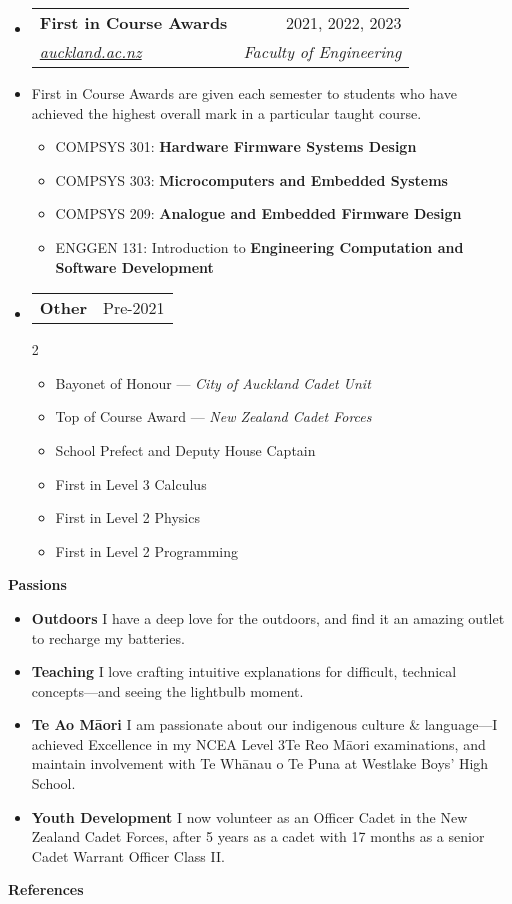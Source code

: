 \documentclass[11pt,a4paper]{article}[leftmargin=*]
\makeatletter
\def \entryspacing {-0pt}
\def \bulletstylei {\faAngleRight\hspace{-4.5pt}}
\renewcommand{\section}[2]{\vspace{5pt}
  \colorbox{secondary}{\color{white}\raggedbottom\normalsize\textbf{{#1}{\hspace{2pt}#2\hspace{4pt}}}}
}
\newcommand{\resumeEntryStart}{\begin{itemize}[leftmargin=2.5mm]}
\newcommand{\resumeEntryEnd}{\end{itemize}\vspace{\entryspacing}}
\newcommand{\resumeItemListStart}{\begin{itemize}[leftmargin=4.5mm]}
\newcommand{\resumeItemListEnd}{\end{itemize}}
\newcommand{\resumeItemListStartColumns}[2][-0.5]{\vspace*{#1\multicolsep}
\begin{multicols}{#2}\begin{itemize}[leftmargin=4.5mm]}
\newcommand{\resumeItemListEndColumns}[1][-1]{\end{itemize}\end{multicols}\vspace*{#1\multicolsep}}
\newcommand{\resumeItem}[2][\bulletstylei]{
  \item[\small#1]\small{
    {#2 \vspace{-2pt}}
  }
}
\newcommand{\resumeEntryTSDL}[4]{
  \vspace{-1pt}\item[]
    \begin{tabularx}{0.97\textwidth}{X@{\hspace{60pt}}r}
      \textbf{\color{primary}#1} & {\firabook\color{accent}\small#2} \\
      \textit{\color{accent}\small#3} & \textit{\color{accent}\small#4} \\
    \end{tabularx}\vspace{-6pt}
}
\newcommand{\resumeEntryTD}[2]{
  \vspace{-1pt}\item[]
    \begin{tabularx}{0.97\textwidth}{X@{\hspace{60pt}}r}
      \textbf{\color{primary}#1} & {\firabook\color{accent}\small#2} \\
    \end{tabularx}\vspace{-6pt}
}
\newcommand{\resumeEntryS}[2]{
  \item[]\small{
    \textbf{\color{primary}#1 }{ #2 \vspace{-4pt}}
  }
}
\newcommand{\resumeEntryP}[1]{
  \item[]\small{
    #1 \vspace{-4pt}
  }\\
}
\newcommand{\resumeIt}[1]{\textit{\color{accent}#1}}
\newcommand{\resumeBf}[1]{\small\textbf{\color{halfbold}#1}}
\makeatother
\begin{document}
\resumeEntryStart
\resumeEntryTSDL
{First in Course Awards}{2021, 2022, 2023}
{\href{https://www.auckland.ac.nz/assets/study/scholarships-and-funding/find-a-scholarship-or-award/regulations/first-in-course-award.pdf}{auckland.ac.nz}}{Faculty of Engineering}
\resumeEntryP {First in Course Awards are given each semester to students who have achieved the highest overall mark in a particular taught course.}
\resumeItemListStart
\resumeItem {COMPSYS 301: \resumeBf{Hardware Firmware Systems Design}}
\resumeItem {COMPSYS 303: \resumeBf{Microcomputers and Embedded Systems}}
\resumeItem {COMPSYS 209: \resumeBf{Analogue and Embedded Firmware Design}}
\resumeItem {ENGGEN 131: Introduction to \resumeBf{Engineering Computation and Software Development}}
\resumeItemListEnd
\resumeEntryEnd

\resumeEntryStart
\resumeEntryTD
{Other}{Pre-2021}
\resumeItemListStartColumns{2}
\resumeItem {Bayonet of Honour --- \resumeIt{City of Auckland Cadet Unit}}
\resumeItem {Top of Course Award --- \resumeIt{New Zealand Cadet Forces}}
\resumeItem {School Prefect and Deputy House Captain}
\resumeItem {First in Level 3 Calculus}
\resumeItem {First in Level 2 Physics}
\resumeItem {First in Level 2 Programming}
\resumeItemListEndColumns
\resumeEntryEnd


\section{\faUserCircle}{Passions}

\resumeEntryStart
\resumeEntryS
{Outdoors}
{
  I have a deep love for the outdoors, and find it an amazing outlet to recharge my batteries.
}

\resumeEntryS
{Teaching}
{
  I love crafting intuitive explanations for difficult, technical concepts---and seeing the lightbulb moment.
}

\resumeEntryS
{Te Ao Māori}
{
  I am passionate about our indigenous culture \& language---I achieved Excellence in my NCEA Level 3\break Te Reo Māori examinations, and maintain involvement with Te Whānau o Te Puna at Westlake Boys' High School.
}

\resumeEntryS
{Youth Development}
{
  I now volunteer as an Officer Cadet in the New Zealand Cadet Forces, after 5 years as a cadet with 17 months as a senior Cadet Warrant Officer Class II.
}
\resumeEntryEnd


\section{\faUserCheck}{References}
\end{document}

